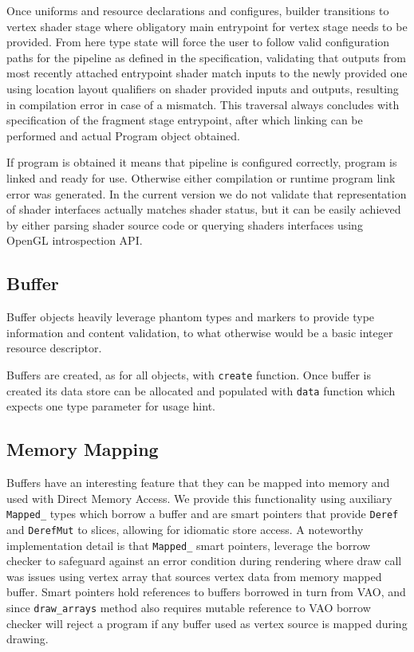 Once uniforms and resource declarations and configures, builder transitions to vertex shader stage where obligatory main entrypoint for vertex stage needs to be provided.
From here type state will force the user to follow valid configuration paths for the pipeline as defined in the specification, 
validating that outputs from most recently attached entrypoint shader match inputs to the newly provided one using location layout qualifiers 
on shader provided inputs and outputs, resulting in compilation error in case of a mismatch. 
This traversal always concludes with specification of the fragment stage entrypoint, after which linking can be performed and actual Program object obtained.

If program is obtained it means that pipeline is configured correctly, program is linked and ready for use. Otherwise either compilation or runtime program link error was generated.
In the current version we do not validate that representation of shader interfaces actually matches shader status, but it can be easily achieved 
by either parsing shader source code or querying shaders interfaces using OpenGL introspection API.

\subsection{Buffer}

Buffer objects heavily leverage phantom types and markers to provide type information and content validation, to what otherwise would be a basic integer resource descriptor.

Buffers are created, as for all objects, with \texttt{create} function.
Once buffer is created its data store can be allocated and populated with \texttt{data} function which expects one type parameter for usage hint.

\subsection{Memory Mapping}

Buffers have an interesting feature that they can be mapped into memory and used with Direct Memory Access.
We provide this functionality using auxiliary \texttt{Mapped\_} types which borrow a buffer and are smart pointers that provide \texttt{Deref} and \texttt{DerefMut} to slices,
allowing for idiomatic store access.
A noteworthy implementation detail is that \texttt{Mapped\_} smart pointers, leverage the borrow checker to safeguard against an error condition during rendering
where draw call was issues using vertex array that sources vertex data from memory mapped buffer. 
Smart pointers hold references to buffers borrowed in turn from VAO, and since \texttt{draw\_arrays} method also requires mutable reference to VAO borrow checker will reject
a program if any buffer used as vertex source is mapped during drawing.

